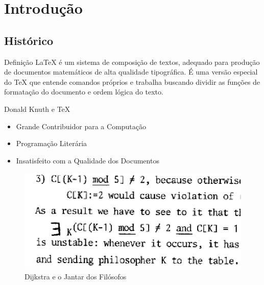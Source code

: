 \documentclass[hyperref={pdfpagelabels=false}]{beamer}
\begin{document}
\section{Introdução}
\label{sec:introducao}

\subsection{Histórico}

\begin{frame}{Definição}
    \LaTeX{} é um sistema de composição de textos\cite{oetiker2008}, adequado
    para produção de documentos matemáticos de alta qualidade tipográfica. É uma
    versão especial do \TeX{} que entende comandos próprios\cite{lamport1994} e
    trabalha buscando dividir as funções de formatação do documento e ordem
    lógica do texto.
\end{frame}

\begin{frame}{Donald Knuth e \TeX{}}
    \begin{itemize}
        \item Grande Contribuidor para a Computação
        \item Programação Literária
        \item Insatisfeito com a Qualidade dos Documentos
    \end{itemize}
    \pause{}
    \begin{figure}
        \centering{}
        \includegraphics[scale=0.5]{src/dijkstra.png}
        \caption{Dijkstra e o Jantar dos Filósofos}
        \label{fig:dijkstra}
    \end{figure}
\end{frame}
\end{document}
